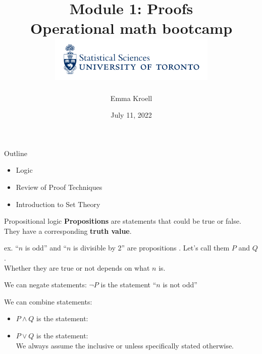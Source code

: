\documentclass [aspectratio=169]{beamer}
\title[]{Module 1: Proofs \\ {\large Operational math bootcamp}\\ \includegraphics[width=8cm]{dept_logo.png}\vspace{-1em}}
\author[]{Emma Kroell}
\institute[]{University of Toronto}
\date{July 11, 2022}
\begin{document}
{
\begin{frame}
    \titlepage
\end{frame}
}

\begin{frame}{Outline}
    \begin{itemize}
      \setlength\itemsep{1em}
    	\item Logic
        \item Review of Proof Techniques
        \item Introduction to Set Theory
    \end{itemize}
\end{frame}


\begin{frame}{Propositional logic}{}
{\bf Propositions} are statements that could be true or false. They have a corresponding {\bf truth value}. \\

\vspace{1em}

ex. ``$n$ is odd'' and ``$n$ is divisible by 2'' are propositions . Let's call them $P$ and $Q$. \\

Whether they are true or not depends on what $n$ is. \\

\vspace{1em}

We can  negate statements: $\neg P$ is the statement ``$n$ is not odd''

\vspace{1em}
 We can combine statements: 
 \begin{itemize}
 \item $P \wedge Q$ is the statement:
 \item $P \vee Q$ is the statement: \\
 We always assume the inclusive or unless specifically stated otherwise.
\end{itemize}
\end{frame}
\end{document}
